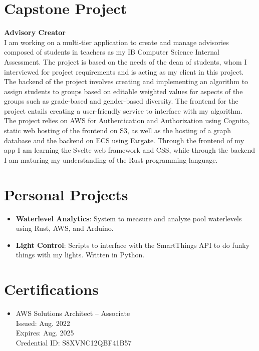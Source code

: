 \documentclass[letterpaper,11pt]{article}
\newcommand{\resumeItem}[2]{
    \item\small{
        \textbf{#1}{: #2 \vspace{-3pt}}
    }
}
\newcommand{\resumeSubItem}[2]{\resumeItem{#1}{#2}\vspace{-4pt}}
\newcommand{\resumeSubHeadingListStart}{\begin{itemize}[leftmargin=*]}
\newcommand{\resumeSubHeadingListEnd}{\end{itemize}}
\begin{document}
\section{Capstone Project}
    \textbf{Advisory Creator}\\
    I am working on a multi-tier application to create and manage advisories composed of students in teachers as my IB Computer Science Internal Assessment.
    The project is based on the needs of the dean of students, whom I interviewed for project requirements and is acting as my client in this project.\\
    \vspace{0.15cm}
    The backend of the project involves creating and implementing an algorithm to assign students to groups based on editable weighted values for aspects of the groups such as grade-based and gender-based diversity.
    The frontend for the project entails creating a user-friendly service to interface with my algorithm.\\
    \vspace{0.15cm}
    The project relies on AWS for Authentication and Authorization using Cognito, static web hosting of the frontend on S3, as well as the hosting of a graph database and the backend on ECS using Fargate.
    Through the frontend of my app I am learning the Svelte web framework and CSS, while through the backend I am maturing my understanding of the Rust programming language.\\

\section{Personal Projects}
    \resumeSubHeadingListStart
        \resumeSubItem{Waterlevel Analytics}
            {System to measure and analyze pool waterlevels using Rust, AWS, and Arduino.}
        \resumeSubItem{Light Control}
            {Scripts to interface with the SmartThings API to do funky things with my lights. Written in Python.}
    \resumeSubHeadingListEnd


    \section{Certifications}
    \resumeSubHeadingListStart
        \item{
            AWS Solutions Architect -- Associate\\
            \hspace{.3cm}\small Issued: Aug. 2022\\
            \hspace{.3cm}\small Expires: Aug. 2025\\
            \hspace{.3cm}\small Credential ID: S8XVNC12QBF41B57\\
        }
    \resumeSubHeadingListEnd
\end{document}
